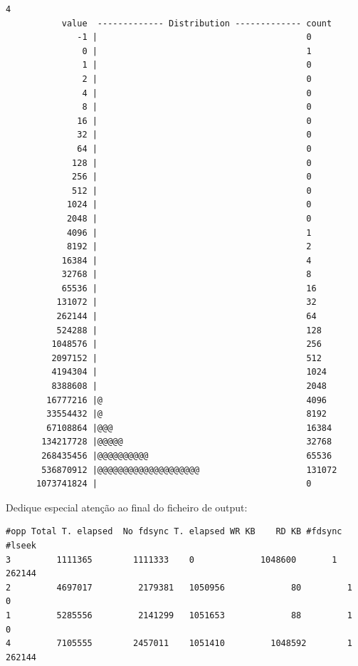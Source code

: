 \documentclass[a4paper]{article}
\begin{document}
{\begin{lstlisting}[style=output]
        4
           value  ------------- Distribution ------------- count    
              -1 |                                         0        
               0 |                                         1        
               1 |                                         0        
               2 |                                         0        
               4 |                                         0        
               8 |                                         0        
              16 |                                         0        
              32 |                                         0        
              64 |                                         0        
             128 |                                         0        
             256 |                                         0        
             512 |                                         0        
            1024 |                                         0        
            2048 |                                         0        
            4096 |                                         1        
            8192 |                                         2        
           16384 |                                         4        
           32768 |                                         8        
           65536 |                                         16       
          131072 |                                         32       
          262144 |                                         64       
          524288 |                                         128      
         1048576 |                                         256      
         2097152 |                                         512      
         4194304 |                                         1024     
         8388608 |                                         2048     
        16777216 |@                                        4096     
        33554432 |@                                        8192     
        67108864 |@@@                                      16384    
       134217728 |@@@@@                                    32768    
       268435456 |@@@@@@@@@@                               65536    
       536870912 |@@@@@@@@@@@@@@@@@@@@                     131072   
      1073741824 |                                         0        
\end{lstlisting}

Dedique especial atenção ao final do ficheiro de output:


\begin{lstlisting}[style=command]
#opp Total T. elapsed  No fdsync T. elapsed WR KB    RD KB #fdsync  #lseek
3    	  1111365	     1111333	0  	          1048600       1      262144
2    	  4697017	      2179381	1050956  	        80         1      0
1    	  5285556	      2141299	1051653  	        88         1      0
4    	  7105555	     2457011	1051410  	    1048592        1      262144


\end{lstlisting}}
\end{document}
